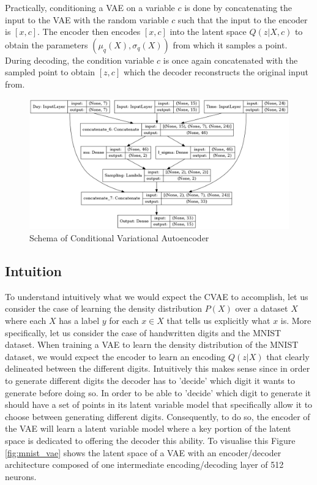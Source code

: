 Practically, conditioning a VAE on a variable $c$ is done by concatenating the input to the VAE with the random variable $c$ such that the input to the encoder is $[x,c]$. The encoder then encodes $[x,c]$ into the latent space $Q(z|X,c)$ to obtain the parameters $(\mu_q(X), \sigma_q(X))$ from which it samples a point. During decoding, the condition variable $c$ is once again concatenated with the sampled point to obtain $[z,c]$ which the decoder reconstructs the original input from. 

 \begin{figure}[htbp]
     \centering
     \includegraphics[width=1\textwidth]{images/c_vae}
     \caption{Schema of Conditional Variational Autoencoder}
     \label{fig:cvae_schema}
 \end{figure}
 
\subsection{Intuition}
To understand intuitively what we would expect the CVAE to accomplish, let us consider the case of learning the density distribution $P(X)$ over a dataset $X$ where each $X$ has a label $y$ for each $x \in X$ that tells us explicitly what $x$ is. More specifically, let us consider the case of handwritten digits and the MNIST dataset. When training a VAE to learn the density distribution of the MNIST dataset, we would expect the encoder to learn an encoding $Q(z|X)$ that clearly delineated between the different digits. Intuitively this makes sense since in order to generate different digits the decoder has to 'decide' which digit it wants to generate before doing so. In order to be able to 'decide' which digit to generate it should have a set of points in its latent variable model that specifically allow it to choose between generating different digits. Consequently, to do so, the encoder of the VAE will learn a latent variable model where a key portion of the latent space is dedicated to offering the decoder this ability. To visualise this Figure \ref{fig:mnist_vae} shows the latent space of a VAE with an encoder/decoder architecture composed of one intermediate encoding/decoding layer of 512 neurons. \\


